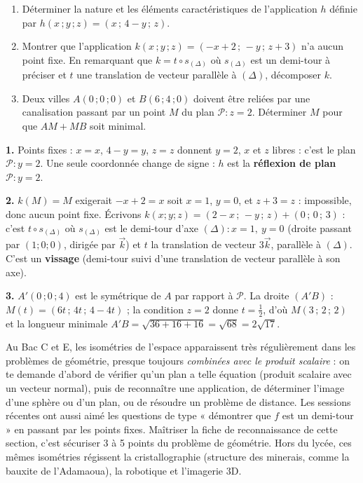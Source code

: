\documentclass[11pt]{article}
\begin{document}
\begin{exercice}
\begin{enumerate}
\item Déterminer la nature et les éléments caractéristiques de l'application $h$ définie par $h(x\,;y\,;z) = (x\,;\,4 - y\,;\,z)$.
\item Montrer que l'application $k(x\,;y\,;z) = (-x + 2\,;\,-y\,;\,z + 3)$ n'a aucun point fixe. En remarquant que $k = t \circ s_{(\Delta)}$ où $s_{(\Delta)}$ est un demi-tour à préciser et $t$ une translation de vecteur parallèle à $(\Delta)$, décomposer $k$.
\item Deux villes $A(0\,;0\,;0)$ et $B(6\,;4\,;0)$ doivent être reliées par une canalisation passant par un point $M$ du plan $\mathcal{P} : z = 2$. Déterminer $M$ pour que $AM + MB$ soit minimal.
\end{enumerate}
\end{exercice}

\begin{corrige}[Exercice]
\textbf{1.} Points fixes : $x = x$, $4 - y = y$, $z = z$ donnent $y = 2$, $x$ et $z$ libres : c'est le plan $\mathcal{P} : y = 2$. Une seule coordonnée change de signe : $h$ est la \textbf{réflexion de plan $\mathcal{P} : y = 2$}.

\textbf{2.} $k(M) = M$ exigerait $-x + 2 = x$ soit $x = 1$, $y = 0$, et $z + 3 = z$ : impossible, donc aucun point fixe. Écrivons $k(x;y;z) = (2 - x\,;\,-y\,;\,z) + (0\,;\,0\,;\,3)$ : c'est $t \circ s_{(\Delta)}$ où $s_{(\Delta)}$ est le demi-tour d'axe $(\Delta) : x = 1,\ y = 0$ (droite passant par $(1;0;0)$, dirigée par $\vec{k}$) et $t$ la translation de vecteur $3\vec{k}$, parallèle à $(\Delta)$. C'est un \textbf{vissage} (demi-tour suivi d'une translation de vecteur parallèle à son axe).

\textbf{3.} $A'(0\,;0\,;4)$ est le symétrique de $A$ par rapport à $\mathcal{P}$. La droite $(A'B)$ : $M(t) = (6t\,;\,4t\,;\,4 - 4t)$ ; la condition $z = 2$ donne $t = \tfrac{1}{2}$, d'où $M(3\,;\,2\,;\,2)$ et la longueur minimale $A'B = \sqrt{36 + 16 + 16} = \sqrt{68} = 2\sqrt{17}$.
\end{corrige}

\begin{savaistu}
Au Bac C et E, les isométries de l'espace apparaissent très régulièrement dans les problèmes de géométrie, presque toujours \emph{combinées avec le produit scalaire} : on te demande d'abord de vérifier qu'un plan a telle équation (produit scalaire avec un vecteur normal), puis de reconnaître une application, de déterminer l'image d'une sphère ou d'un plan, ou de résoudre un problème de distance. Les sessions récentes ont aussi aimé les questions de type « démontrer que $f$ est un demi-tour » en passant par les points fixes. Maîtriser la fiche de reconnaissance de cette section, c'est sécuriser 3 à 5 points du problème de géométrie. Hors du lycée, ces mêmes isométries régissent la cristallographie (structure des minerais, comme la bauxite de l'Adamaoua), la robotique et l'imagerie 3D.
\end{savaistu}
\end{document}
